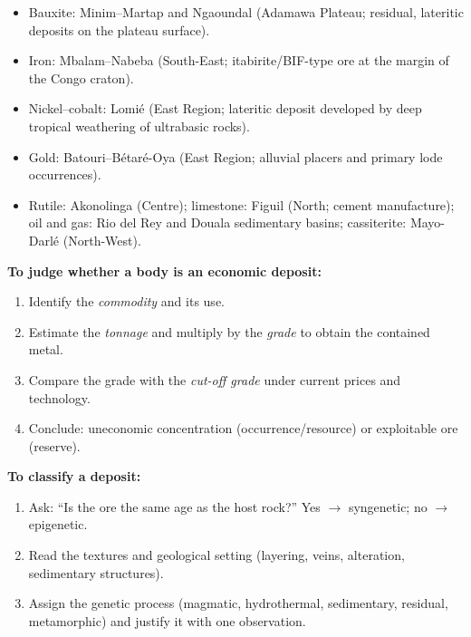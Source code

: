 \documentclass[11pt]{article}
\newcommand{\cle}[1]{{\popxbold\color{popdark}#1}}
\begin{document}
\begin{aretenir}
\begin{itemize}
\item \cle{Bauxite}: Minim--Martap and Ngaoundal (Adamawa Plateau; residual, lateritic deposits on the plateau surface).
\item \cle{Iron}: Mbalam--Nabeba (South-East; itabirite/BIF-type ore at the margin of the Congo craton).
\item \cle{Nickel--cobalt}: Lomi\'e (East Region; lateritic deposit developed by deep tropical weathering of ultrabasic rocks).
\item \cle{Gold}: Batouri--B\'etar\'e-Oya (East Region; alluvial placers and primary lode occurrences).
\item \cle{Rutile}: Akonolinga (Centre); \cle{limestone}: Figuil (North; cement manufacture); \cle{oil and gas}: Rio del Rey and Douala sedimentary basins; \cle{cassiterite}: Mayo-Darl\'e (North-West).
\end{itemize}
\end{aretenir}

\begin{methode}
\textbf{To judge whether a body is an economic deposit:}
\begin{enumerate}
\item Identify the \emph{commodity} and its use.
\item Estimate the \emph{tonnage} and multiply by the \emph{grade} to obtain the contained metal.
\item Compare the grade with the \emph{cut-off grade} under current prices and technology.
\item Conclude: uneconomic concentration (occurrence/resource) or exploitable ore (reserve).
\end{enumerate}
\textbf{To classify a deposit:}
\begin{enumerate}
\item Ask: ``Is the ore the same age as the host rock?'' Yes $\rightarrow$ syngenetic; no $\rightarrow$ epigenetic.
\item Read the textures and geological setting (layering, veins, alteration, sedimentary structures).
\item Assign the genetic process (magmatic, hydrothermal, sedimentary, residual, metamorphic) and justify it with one observation.
\end{enumerate}
\end{methode}
\end{document}
